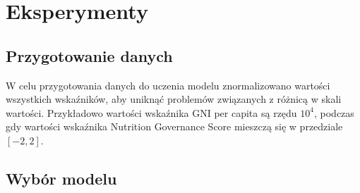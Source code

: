 \documentclass{article}
\begin{document}
\section{Eksperymenty}

\subsection{Przygotowanie danych}
W celu przygotowania danych do uczenia modelu znormalizowano wartości wszystkich wskaźników, 
aby uniknąć problemów związanych z różnicą w skali wartości. Przykładowo wartości wskaźnika GNI per capita są rzędu $10^{4}$, 
podczas gdy wartości wskaźnika Nutrition Governance Score mieszczą się w przedziale $[-2,2]$.

\subsection{Wybór modelu}
\end{document}
